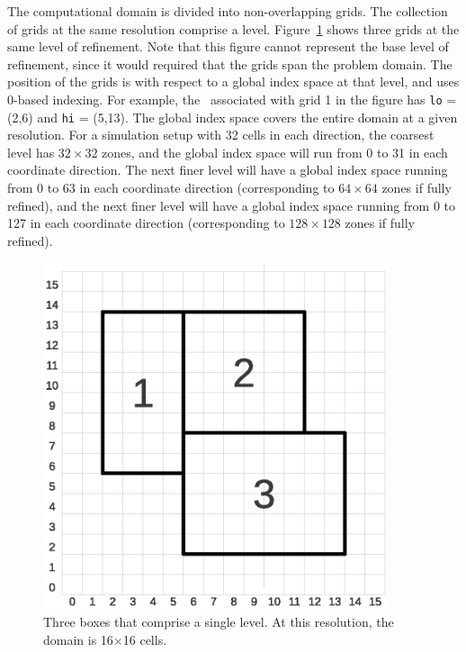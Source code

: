 The computational domain is divided into non-overlapping grids.  
The collection of grids at the same resolution comprise a level.
Figure~\ref{fig:boxes} shows three grids at the same level of
refinement.  Note that this figure cannot represent the base level of refinement,
since it would required that the grids span the problem domain.
The position of the grids is with respect to a global
index space at that level, and uses 0-based indexing.
For example, the \BoxType\ associated with grid 1 
in the figure has {\tt lo} = (2,6) and {\tt hi} = (5,13).
The global index space covers the entire domain at a given resolution.
For a simulation setup with 32 cells in each direction,
the coarsest level has $32 \times 32$ zones, and the
global index space will run from 0 to 31 in each coordinate
direction.  The next finer level will have a global index space running from 
0 to 63 in each coordinate direction (corresponding to $64 \times
64$ zones if fully refined), and the next finer level will have a global index
space running from 0 to 127 in each coordinate direction
(corresponding to $128\times 128$ zones if fully refined).
\begin{figure}[tb]
\centering
\includegraphics[width=4.0in]{./Introduction/index_grid2}
\caption{\label{fig:boxes} Three boxes that comprise a single level.
At this resolution, the domain is 16$\times$16 cells.}
\end{figure}

\subsection{\BoxArray}

